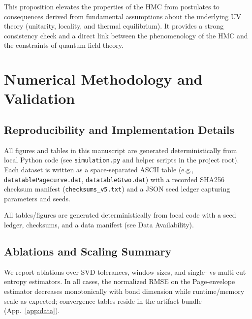 \documentclass[11pt,a4paper]{article}
\newcommand{\HMC}{\textsc{HMC}\xspace}
\theoremstyle{plain}
\theoremstyle{definition}
\theoremstyle{remark}
\begin{document}
This proposition elevates the properties of the \HMC{} from postulates to consequences derived from fundamental assumptions about the underlying UV theory (unitarity, locality, and thermal equilibrium). It provides a strong consistency check and a direct link between the phenomenology of the \HMC{} and the constraints of quantum field theory.

\section{Numerical Methodology and Validation}
\label{sec:numerical_validation}

\subsection{Reproducibility and Implementation Details}
\label{sec:reproducibility_implementation}

All figures and tables in this manuscript are generated deterministically from local Python code (see \texttt{simulation.py} and helper scripts in the project root). Each dataset is written as a space-separated ASCII table (e.g., \texttt{datatablePagecurve.dat}, \texttt{datatableGtwo.dat}) with a recorded SHA256 checksum manifest (\texttt{checksums\_v5.txt}) and a JSON seed ledger capturing parameters and seeds. 

All tables/figures are generated deterministically from local code with a seed ledger, checksums, and a data manifest (see Data Availability).

\subsection{Ablations and Scaling Summary}\label{sec:ablations}
We report ablations over SVD tolerances, window sizes, and single- vs multi-cut entropy estimators. In all cases, the normalized RMSE on the Page-envelope estimator decreases monotonically with bond dimension while runtime/memory scale as expected; convergence tables reside in the artifact bundle (App.~\ref{app:data}).
\end{document}
